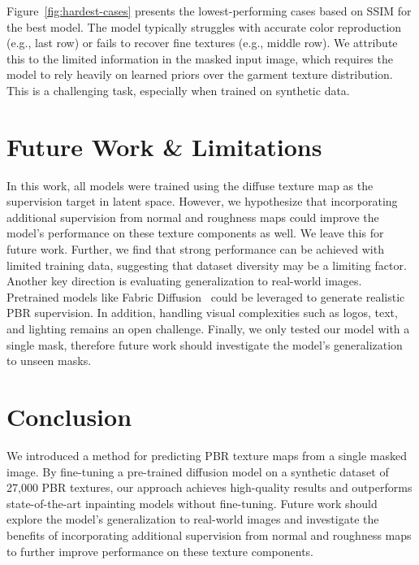 \documentclass[11pt,twocolumn]{article}
\begin{document}
Figure~\ref{fig:hardest-cases} presents the lowest-performing cases based on SSIM for the 
best model. The model typically struggles with accurate color reproduction (e.g., last row) 
or fails to recover fine textures (e.g., middle row). We attribute this to the limited 
information in the masked input image, which requires the model to rely heavily on 
learned priors over the garment texture distribution. This is a challenging task, 
especially when trained on synthetic data.


\section{Future Work \& Limitations}
In this work, all models were trained using the diffuse texture map as the supervision target 
in latent space. However, we hypothesize that incorporating additional supervision from normal and 
roughness maps could improve the model's performance on these texture components as well. We leave this 
for future work. Further, we find that strong performance can be achieved with limited training data, 
suggesting that dataset diversity may be a limiting factor. Another key direction is evaluating generalization to real-world images. 
Pretrained models like Fabric Diffusion~\cite{fabricdiffusion} could be leveraged to generate realistic PBR supervision. 
In addition, handling visual complexities such as logos, text, and lighting remains an open challenge. Finally,
we only tested our model with a single mask, therefore future work should investigate the model's generalization to 
unseen masks.

\section{Conclusion}
We introduced a method for predicting PBR texture maps from a single masked image. 
By fine-tuning a pre-trained diffusion model on a synthetic dataset of 27,000 PBR textures, 
our approach achieves high-quality results and outperforms state-of-the-art inpainting models 
without fine-tuning. Future work should explore the model's generalization to real-world images and 
investigate the benefits of incorporating additional supervision from normal and roughness maps 
to further improve performance on these texture components.

\newpage


\end{document}
